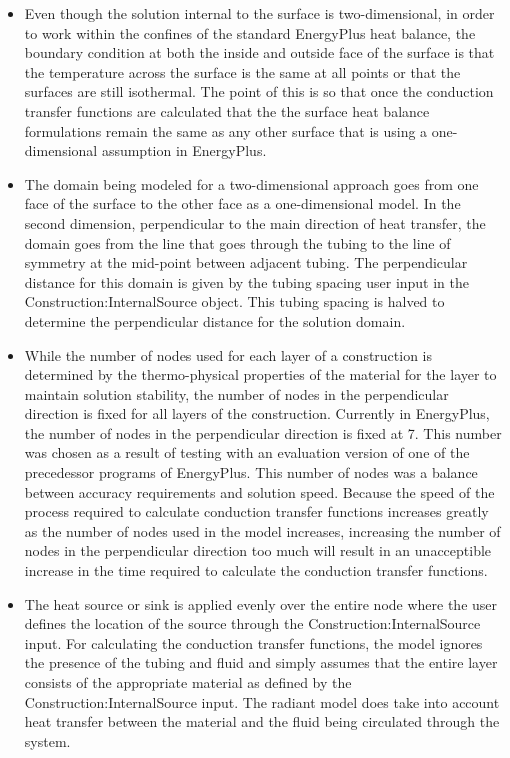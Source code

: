\begin{itemize}
\item
Even though the solution internal to the surface is two-dimensional, in order to work within the confines of the standard EnergyPlus heat balance, the boundary condition at both the inside and outside face of the surface is that the temperature across the surface is the same at all points or that the surfaces are still isothermal.  The point of this is so that once the conduction transfer functions are calculated that the the surface heat balance formulations remain the same as any other surface that is using a one-dimensional assumption in EnergyPlus.
\item
The domain being modeled for a two-dimensional approach goes from one face of the surface to the other face as a one-dimensional model.  In the second dimension, perpendicular to the main direction of heat transfer, the domain goes from the line that goes through the tubing to the line of symmetry at the mid-point between adjacent tubing.  The perpendicular distance for this domain is given by the tubing spacing user input in the Construction:InternalSource object.  This tubing spacing is halved to determine the perpendicular distance for the solution domain.
\item
While the number of nodes used for each layer of a construction is determined by the thermo-physical properties of the material for the layer to maintain solution stability, the number of nodes in the perpendicular direction is fixed for all layers of the construction.  Currently in EnergyPlus, the number of nodes in the perpendicular direction is fixed at 7.  This number was chosen as a result of testing with an evaluation version of one of the precedessor programs of EnergyPlus.  This number of nodes was a balance between accuracy requirements and solution speed.  Because the speed of the process required to calculate conduction transfer functions increases greatly as the number of nodes used in the model increases, increasing the number of nodes in the perpendicular direction too much will result in an unacceptible increase in the time required to calculate the conduction transfer functions.
\item
The heat source or sink is applied evenly over the entire node where the user defines the location of the source through the Construction:InternalSource input.  For calculating the conduction transfer functions, the model ignores the presence of the tubing and fluid and simply assumes that the entire layer consists of the appropriate material as defined by the Construction:InternalSource input.  The radiant model does take into account heat transfer between the material and the fluid being circulated through the system.

\end{itemize}
